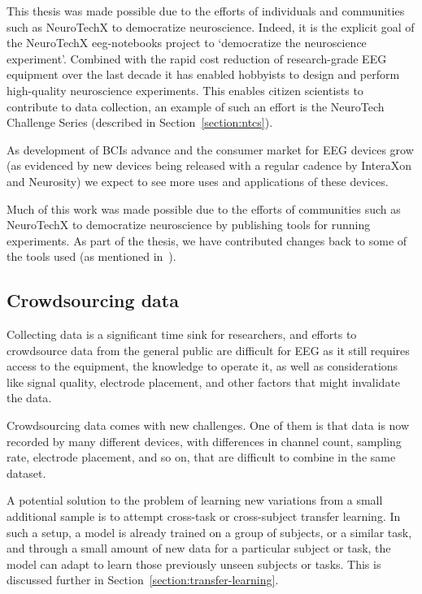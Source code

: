     This thesis was made possible due to the efforts of individuals and communities such as NeuroTechX to democratize neuroscience. Indeed, it is the explicit goal of the NeuroTechX eeg-notebooks project to `democratize the neuroscience experiment'. Combined with the rapid cost reduction of research-grade EEG equipment over the last decade it has enabled hobbyists to design and perform high-quality neuroscience experiments. This enables citizen scientists to contribute to data collection, an example of such an effort is the NeuroTech Challenge Series (described in Section~\ref{section:ntcs}).

    As development of BCIs advance and the consumer market for EEG devices grow (as evidenced by new devices being released with a regular cadence by InteraXon and Neurosity) we expect to see more uses and applications of these devices.

    Much of this work was made possible due to the efforts of communities such as NeuroTechX to democratize neuroscience by publishing tools for running experiments. As part of the thesis, we have contributed changes back to some of the tools used (as mentioned in~).

\subsection{Crowdsourcing data}

    Collecting data is a significant time sink for researchers, and efforts to crowdsource data from the general public are difficult for EEG as it still requires access to the equipment, the knowledge to operate it, as well as considerations like signal quality, electrode placement, and other factors that might invalidate the data.

    Crowdsourcing data comes with new challenges. One of them is that data is now recorded by many different devices, with differences in channel count, sampling rate, electrode placement, and so on, that are difficult to combine in the same dataset. 

    A potential solution to the problem of learning new variations from a small additional sample is to attempt cross-task or cross-subject transfer learning. In such a setup, a model is already trained on a group of subjects, or a similar task, and through a small amount of new data for a particular subject or task, the model can adapt to learn those previously unseen subjects or tasks. This is discussed further in Section~\ref{section:transfer-learning}.

